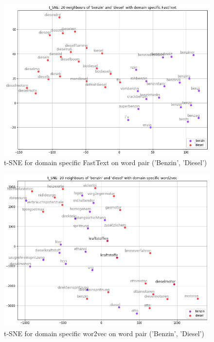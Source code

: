 \documentclass[10pt,a4paper]{article}
\begin{document}
\begin{figure}
	\begin{center}
	\includegraphics[scale=0.4]{./Pictures/model_ds_ft_benzin_diesel.png}
	
	\caption{t-SNE for domain specific FastText on word pair ('Benzin', 'Diesel')}
	\label{tsne1}
\end{center}
\end{figure}

\begin{figure}
\begin{center}
	\includegraphics[scale=0.4]{./Pictures/model_ds_w2v_benzin_diesel.png}
	\caption{t-SNE for domain specific wor2vec on word pair ('Benzin', 'Diesel')}
\end{center}	
\end{figure}
\end{document}

